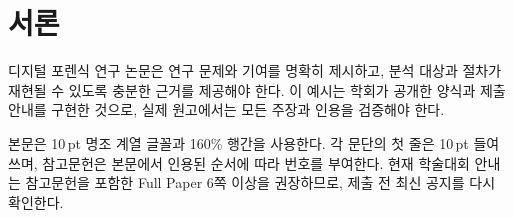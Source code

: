 \section{서론}

디지털 포렌식 연구 논문은 연구 문제와 기여를 명확히 제시하고, 분석 대상과 절차가 재현될 수 있도록 충분한 근거를 제공해야 한다. 이 예시는 학회가 공개한 양식과 제출 안내를 구현한 것으로, 실제 원고에서는 모든 주장과 인용을 검증해야 한다\cite{kdfs2026format}.

본문은 10\,pt 명조 계열 글꼴과 160\% 행간을 사용한다. 각 문단의 첫 줄은 10\,pt 들여쓰며, 참고문헌은 본문에서 인용된 순서에 따라 번호를 부여한다. 현재 학술대회 안내는 참고문헌을 포함한 Full Paper 6쪽 이상을 권장하므로, 제출 전 최신 공지를 다시 확인한다.
